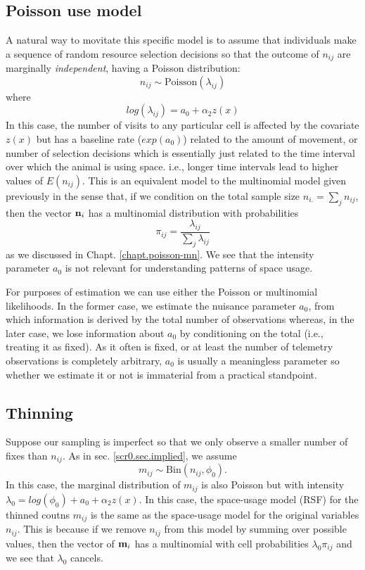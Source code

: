 \subsection{Poisson use model}

A natural way to movitate this specific model is to
assume that individuals make a sequence of random resource selection
decisions so that the outcome of $n_{ij}$ are marginally {\it
  independent}, having a Poisson distribution:
\[
 n_{ij} \sim \mbox{Poisson}( \lambda_{ij})
\]
where
\[
 log(\lambda_{ij}) = a_{0}  + \alpha_{2} z(x)
\]
In this case,
 the number of visits to any particular cell is affected by
the covariate $z(x)$ but has a baseline rate ($exp(a_{0})$) related to the amount
of movement, or number of selection decisions which is essentially
just related to the time interval over which the animal is using
space. i.e., longer time intervals lead to higher values of
$E(n_{ij})$. 
This is an equivalent model to the multinomial model given previously
in the sense that, if we condition on the total sample size $n_{i.} =
\sum_{j} n_{ij}$, then the vector ${\bf n}_{i}$ has a multinomial
distribution with probabilities
\[
 \pi_{ij} = \frac{\lambda_{ij}}{ \sum_{j} \lambda_{ij}}
\]
as we discussed in Chapt. \ref{chapt.poisson-mn}.  We see that the
intensity parameter $a_{0}$ is not relevant for understanding
patterns of space usage.

For purposes of estimation we can use either the Poisson or
multinomial likelihoods. In the former case, we estimate the nuisance
parameter $a_{0}$, from which information is derived by the total
number of observations whereas, in the later case, we lose information
about $a_{0}$ by conditioning on the total (i.e., treating it as
fixed).  As it often is fixed, or at least the number of telemetry
observations is completely arbitrary, $a_{0}$ is usually a meaningless
parameter so whether we estimate it or not is immaterial from a
practical standpoint. 


\subsection{Thinning}

Suppose our sampling is imperfect so that we only observe a smaller
number of fixes than $n_{ij}$. As in sec. \ref{scr0.sec.implied}, we assume
\[
 m_{ij} \sim \mbox{Bin}(n_{ij}, \phi_{0}).
\]
In this case, the marginal distribution of $m_{ij}$ is also Poisson
but with intensity $\lambda_{0} = log(\phi_{0}) + a_{0} +
\alpha_{2}z(x)$.  In this case, the space-usage model (RSF) for the
thinned coutns $m_{ij}$ is the same as the space-usage model for the
original variables $n_{ij}$.  This is because if we remove $n_{ij}$
from this model by summing over possible values, then the vector of
${\bf m}_{i}$ has a multinomial with cell probabilities
$\lambda_{0}\pi_{ij}$ and we see that $\lambda_{0}$ cancels.

